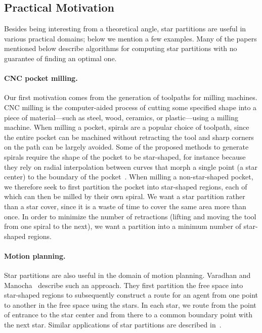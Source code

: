 \documentclass{theoretics}
\begin{document}
\subsection{Practical Motivation}\label{sec:practical}

Besides being interesting from a theoretical angle, star partitions are useful in various practical domains; below we mention a few examples.
Many of the papers mentioned below describe algorithms for computing star partitions with no guarantee of finding an optimal one.

\paragraph{CNC pocket milling.}
Our first motivation comes from the generation of toolpaths for milling machines.
CNC milling is the computer-aided process of cutting some specified shape into a piece of material---such as steel, wood, ceramics, or plastic---using a milling machine.
When milling a pocket, spirals are a popular choice of toolpath, since the entire pocket can be machined without retracting the tool and sharp corners on the path can be largely avoided.
Some of the proposed methods to generate spirals require the shape of the pocket to be star-shaped, for instance because they rely on radial interpolation between curves that morph a single point (a star center) to the boundary of the pocket~\cite{bieterman2003curvilinear,patel2019effect,banerjee2012process}.
When milling a non-star-shaped pocket, we therefore seek to first partition the pocket into star-shaped regions, each of which can then be milled by their own spiral.
We want a star partition rather than a star cover, since it is a waste of time to cover the same area more than once.
In order to minimize the number of retractions (lifting and moving the tool from one spiral to the next), we want a partition into a minimum number of star-shaped regions.

\paragraph{Motion planning.}
Star partitions are also useful in the domain of motion planning.
Varadhan and Manocha~\cite{varadhan2005star} describe such an approach. They first partition the free space into star-shaped regions to subsequently construct a route for an agent from one point to another in the free space using the stars.
In each star, we route from the point of entrance to the star center and from there to a common boundary point with the next star.
Similar applications of star partitions are described in~\cite{dobson2014sparse, SPBG:SPBG07:073-080, lien2009planning, zhang2006fast}.
\end{document}
